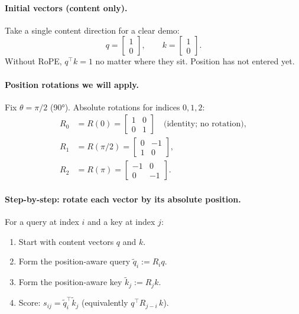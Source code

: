 \documentclass[11pt]{article}
\begin{document}
\paragraph{Initial vectors (content only).}
Take a single content direction for a clear demo:
\[
  q=\begin{bmatrix}1\\0\end{bmatrix},\qquad
  k=\begin{bmatrix}1\\0\end{bmatrix}.
\]
Without RoPE, \(q^\top k=1\) no matter where they sit. Position has not
entered yet.

\paragraph{Position rotations we will apply.}
Fix \(\theta=\pi/2\) (90°). Absolute rotations for indices \(0,1,2\):
\begin{align*}
  R_0 &= R(0)
       = \begin{bmatrix}1&0\\0&1\end{bmatrix}
       \quad\text{(identity; no rotation)}, \\
  R_1 &= R(\pi/2)
       = \begin{bmatrix}0&-1\\1&0\end{bmatrix}, \\
  R_2 &= R(\pi)
       = \begin{bmatrix}-1&0\\0&-1\end{bmatrix}.
\end{align*}

\paragraph{Step-by-step: rotate each vector by its absolute position.}
For a query at index \(i\) and a key at index \(j\):
\begin{enumerate}[leftmargin=*]
  \item Start with content vectors \(q\) and \(k\).
  \item Form the position-aware query
        \(\tilde{q}_i := R_i q\).
  \item Form the position-aware key
        \(\tilde{k}_j := R_j k\).
  \item Score: \(s_{ij}=\tilde{q}_i^\top \tilde{k}_j\)
        (equivalently \(q^\top R_{j-i}\,k\)).
\end{enumerate}
\end{document}
